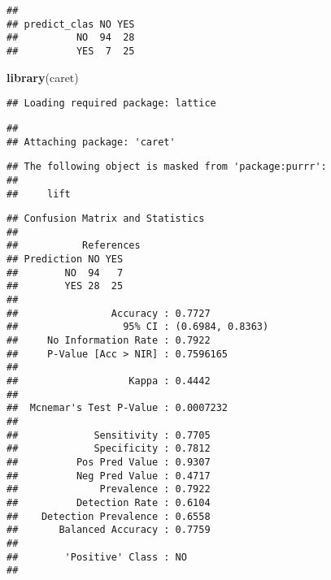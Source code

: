 \documentclass[
]{article}
\newenvironment{Shaded}{\begin{snugshade}}{\end{snugshade}}
\newcommand{\AttributeTok}[1]{\textcolor[rgb]{0.13,0.29,0.53}{#1}}
\newcommand{\ConstantTok}[1]{\textcolor[rgb]{0.56,0.35,0.01}{#1}}
\newcommand{\FunctionTok}[1]{\textcolor[rgb]{0.13,0.29,0.53}{\textbf{#1}}}
\newcommand{\NormalTok}[1]{#1}
\newcommand{\OtherTok}[1]{\textcolor[rgb]{0.56,0.35,0.01}{#1}}
\newcommand{\SpecialCharTok}[1]{\textcolor[rgb]{0.81,0.36,0.00}{\textbf{#1}}}
\newcommand{\StringTok}[1]{\textcolor[rgb]{0.31,0.60,0.02}{#1}}
\begin{document}
\begin{verbatim}
##             
## predict_clas NO YES
##          NO  94  28
##          YES  7  25
\end{verbatim}

\begin{Shaded}
\begin{Highlighting}[]
\FunctionTok{library}\NormalTok{(caret)}
\end{Highlighting}
\end{Shaded}

\begin{verbatim}
## Loading required package: lattice
\end{verbatim}

\begin{verbatim}
## 
## Attaching package: 'caret'
\end{verbatim}

\begin{verbatim}
## The following object is masked from 'package:purrr':
## 
##     lift
\end{verbatim}

\begin{Shaded}
\end{Shaded}

\begin{verbatim}
## Confusion Matrix and Statistics
## 
##           References
## Prediction NO YES
##        NO  94   7
##        YES 28  25
##                                           
##                Accuracy : 0.7727          
##                  95% CI : (0.6984, 0.8363)
##     No Information Rate : 0.7922          
##     P-Value [Acc > NIR] : 0.7596165       
##                                           
##                   Kappa : 0.4442          
##                                           
##  Mcnemar's Test P-Value : 0.0007232       
##                                           
##             Sensitivity : 0.7705          
##             Specificity : 0.7812          
##          Pos Pred Value : 0.9307          
##          Neg Pred Value : 0.4717          
##              Prevalence : 0.7922          
##          Detection Rate : 0.6104          
##    Detection Prevalence : 0.6558          
##       Balanced Accuracy : 0.7759          
##                                           
##        'Positive' Class : NO              
## 
\end{verbatim}
\end{document}
